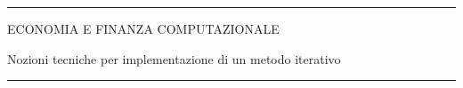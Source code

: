 \documentclass[12pt,aspectratio=169]{beamer}
\begin{document}
\begin{frame}
\unitlength 5mm

\begin{center}

\rule{\textwidth}{2pt}

\vskip3mm
ECONOMIA E FINANZA COMPUTAZIONALE

Nozioni tecniche per implementazione di un metodo iterativo

\rule{\textwidth}{2pt}

\end{center}

\end{frame}


\end{document}
